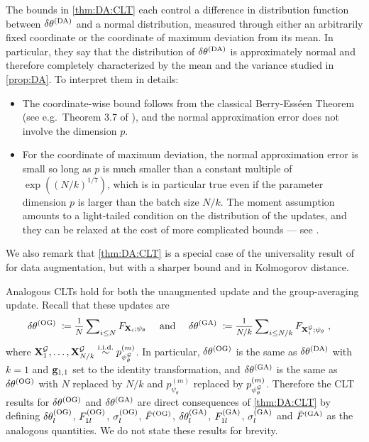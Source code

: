 The bounds in \cref{thm:DA:CLT} each control a difference in distribution function between $\delta \theta^{(\rm DA)}$ and a normal distribution, measured through either an arbitrarily fixed coordinate or the coordinate of maximum deviation from its mean. In particular, they say that the distribution of $\delta \theta^{(\rm DA)}$ is approximately normal and therefore completely characterized by the mean and the variance studied in \cref{prop:DA}. To interpret them in details:
\begin{itemize}
    \item The coordinate-wise bound follows from the classical Berry-Ess\'een Theorem (see e.g.~Theorem 3.7 of \cite{chen2011normal}), and the normal approximation error does not involve the dimension $p$. 
    \item For the coordinate of maximum deviation, the normal approximation error is small so long as $p$ is much smaller than a constant multiple of $\exp( (N/k)^{1/7})$, which is in particular true even if the parameter dimension $p$ is larger than the batch size $N/k$. The moment assumption amounts to a light-tailed condition on the distribution of the updates, and they can be relaxed at the cost of more complicated bounds --- see \citet{chernozhukov2017central}.
\end{itemize}

We also remark that \cref{thm:DA:CLT} is a special case of the universality result of \citet{huang2022quantifying} for data augmentation, but with a sharper bound and in Kolmogorov distance.

\vspace{.5em}

Analogous CLTs hold for both the unaugmented update and the group-averaging update. Recall that these updates are
\begin{align*}
    \delta \theta^{(\rm OG)} 
    \;\coloneqq&\; 
    \mfrac{1}{N} \msum_{i \leq N} 
    F_{\bX_i; \psi_\theta}
    &\text{ and }&&
    \delta \theta^{(\rm GA)} 
    \;\coloneqq&\; 
    \mfrac{1}{N / k} \msum_{i \leq N / k} 
    F_{\bX^\cG_i; \psi_\theta}
    \;,
\end{align*}
where $\mathbf{X}^{\mathcal{G}}_1, \ldots, \mathbf{X}^{\mathcal{G}}_{N/k} \overset{\rm i.i.d.}{\sim} p^{(m)}_{\psi^{\mathcal{G}}_\theta}$. In particular, $\delta \theta^{(\rm OG)}$ is the same as $\delta \theta^{(\rm DA)}$ with $k=1$ and $\mathbf{g}_{1,1}$ set to the identity transformation, and $\delta \theta^{(\rm GA)}$ is the same as $\delta \theta^{(\rm OG)}$ with $N$ replaced by $N/k$ and $p^{(m)}_{\psi_\theta}$ replaced by  $p^{(m)}_{\psi^{\mathcal{G}}_\theta}$. Therefore the CLT results for $\delta \theta^{(\rm OG)} $ and $\delta \theta^{(\rm GA)}$ are direct consequences of \cref{thm:DA:CLT} by defining $\delta \theta^{(\rm OG)}_l$, $F^{(\rm OG)}_{1l}$, $\sigma^{(\rm OG)}_l$, $\tilde F^{(\rm OG)}$, $\delta \theta^{(\rm GA)}_l$, $F^{(\rm GA)}_{1l}$, $\sigma^{(\rm GA)}_l$ and $\tilde F^{(\rm GA)}$ as the analogous quantities. We do not state these results for brevity.

